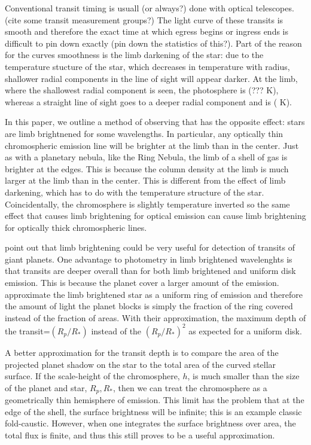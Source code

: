 \documentclass[manuscript]{aastex}
\begin{document}
Conventional transit timing is usuall (or always?) done with optical
telescopes. (cite some transit measurement groups?) The light curve of
these transits is smooth and therefore the exact time at which egress
begins or ingress ends is difficult to pin down exactly (pin down the
statistics of this?). Part of the reason for the curves smoothness is
the limb darkening of the star: due to the temperature stucture of the
star, which decreases in temperature with radius, shallower radial components in the line of sight will appear darker. At the limb, where the shallowest radial component is seen, the photosphere is (??? K), whereas a straight line of sight goes to a deeper radial component and is ( K).

In this paper, we outline a method of observing that has the opposite
effect: stars are limb brightnened for some wavelengths. In
particular, any optically thin chromospheric emission line will be
brighter at the limb than in the center. Just as with a planetary
nebula, like the Ring Nebula, the limb of a shell of gas is brighter
at the edges. This is because the column density at the limb is much
larger at the limb than in the center. This is different from the effect of limb darkening, which has to do with the temperature structure of the star. Coincidentally, the chromosphere is slightly temperature inverted so the same effect that causes limb brightening for optical emission can cause limb brightening for optically thick chromospheric lines.

\citet{2009ApJ...701.1616A} point out that limb brightening could be
very useful for detection of transits of giant planets. One advantage
to photometry in limb brightened wavelenghts is that transits are
deeper overall than for both limb brightened and uniform disk
emission. This is because the planet cover a larger amount of the
emission. \citet{2009Apj...701.1616A} approximate the limb brightened
star as a uniform ring of emission and therefore the amount of light
the planet blocks is simply the fraction of the ring covered instead
of the fraction of areas. With their approximation, the maximum depth
of the transit=$(R_p/R_*)$ instead of the $(R_p/R_*)^2$
as expected for a uniform disk.

A better approximation for the transit depth is to compare the area of
the projected planet shadow on the star to the total area of the
curved stellar surface. If the scale-height of the chromosphere, $h$,
is much smaller than the size of the planet and star, $R_p, R_*$, then
we can treat the chromosphere as a geometrically thin hemisphere of
emission.  This limit has the problem that at the edge of the shell,
the surface brightness will be infinite; this is an example classic
fold-caustic.  However, when one integrates the surface brightness
over area, the total flux is finite, and thus this still proves to be
a useful approximation.
\end{document}
